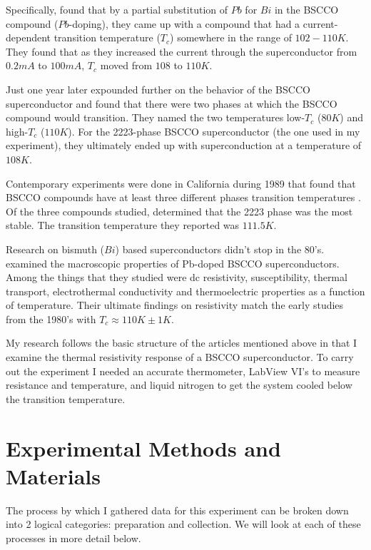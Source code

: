 \documentclass[paper=a4, fontsize=11pt]{scrartcl}
\numberwithin{equation}{section}
\numberwithin{figure}{section}
\numberwithin{table}{section}
\begin{document}
      Specifically, \citet{yanagisawa:1988} found that by a partial substitution of $Pb$ for $Bi$ in the BSCCO compound ($Pb$-doping), they came up with a compound that had a current-dependent transition temperature ($T_c$) somewhere in the range of $102-110K$. They found that as they increased the current through the superconductor from $0.2 mA$ to $100 mA$, $T_c$ moved from $108$ to $110 K$.

      Just one year later \citet{LeePark:1989} expounded further on the behavior of the BSCCO superconductor and found that there were two phases at which the BSCCO compound would transition. They named the two temperatures low-$T_c$ ($80K$) and high-$T_c$ ($110K$). For the 2223-phase BSCCO superconductor (the one used in my experiment), they ultimately ended up with superconduction at a temperature of $108K$.

      Contemporary experiments were done in California during 1989 that found that BSCCO compounds have at least three different phases transition temperatures \citep{Green:1989}. Of the three compounds studied, \citet{Green:1989} determined that the 2223 phase was the most stable. The transition temperature they reported was $111.5K$.

      Research on bismuth ($Bi$) based superconductors didn't stop in the 80's. \citet{anis:2009} examined the macroscopic properties of Pb-doped BSCCO superconductors. Among the things that they studied were dc resistivity, susceptibility, thermal transport, electrothermal conductivity and thermoelectric properties as a function of temperature. Their ultimate findings on resistivity match the early studies from the 1980's with $T_c \approx 110K \pm 1K$.

      My research follows the  basic structure of the articles mentioned above in that I examine the thermal resistivity response of a BSCCO superconductor. To carry out the experiment I needed an accurate thermometer, LabView VI's to measure resistance and temperature, and liquid nitrogen to get the system cooled below the transition temperature.

  \section{Experimental Methods and Materials}

      The process by which I gathered data for this experiment can be broken down into 2 logical categories: preparation and collection. We will look at each of these processes in more detail below.
\end{document}
